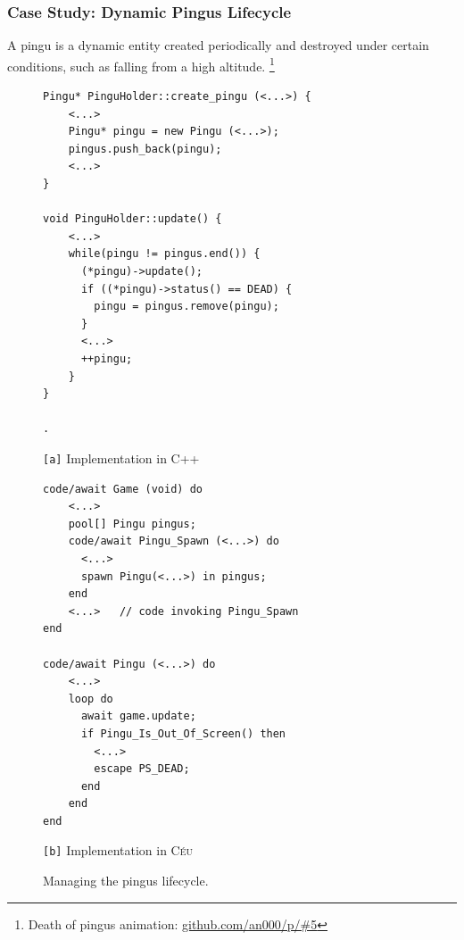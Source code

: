 \documentclass[10pt, conference, compsocconf]{IEEEtran}
\newcommand{\CEU}{\textsc{C\'{e}u}\xspace}
\newcommand{\code}[1] {{\small{\texttt{#1}}}}
\newcommand{\ax}{\code{[a]}\xspace}
\newcommand{\bx}{\code{[b]}\xspace}
\begin{document}

\subsubsection{Case Study: Dynamic Pingus Lifecycle}
\label{sec.pats.lifespan.2}


A pingu is a dynamic entity created periodically and destroyed under certain
conditions, such as falling from a high altitude.%
\footnote{Death of pingus animation: \url{github.com/an000/p/#5} }
%

\begin{figure}
\begin{minipage}[t]{0.50\linewidth}
\begin{lstlisting}[numbers=right]
Pingu* PinguHolder::create_pingu (<...>) {
    <...>
    Pingu* pingu = new Pingu (<...>);
    pingus.push_back(pingu);
    <...>
}

void PinguHolder::update() {
    <...>
    while(pingu != pingus.end()) {
      (*pingu)->update();
      if ((*pingu)->status() == DEAD) {
        pingu = pingus.remove(pingu);
      }
      <...>
      ++pingu;
    }
}

.
\end{lstlisting}
\centering\small{\ax Implementation in C++}
\end{minipage}
%
\begin{minipage}[t]{0.50\linewidth}
\begin{lstlisting}[xleftmargin=2em]
code/await Game (void) do
    <...>
    pool[] Pingu pingus;
    code/await Pingu_Spawn (<...>) do
      <...>
      spawn Pingu(<...>) in pingus;
    end
    <...>   // code invoking Pingu_Spawn
end

code/await Pingu (<...>) do
    <...>
    loop do
      await game.update;
      if Pingu_Is_Out_Of_Screen() then
        <...>
        escape PS_DEAD;
      end
    end
end
\end{lstlisting}
\centering\small{\bx Implementation in \CEU}
\end{minipage}
\caption{ Managing the pingus lifecycle.
\label{lst.pingus}
}
\end{figure}
\end{document}

